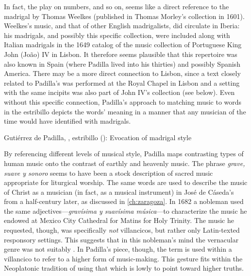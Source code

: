 In fact, the play on numbers,  and so on, seems like a
direct reference to the madrigal  by Thomas Weelkes (published in Thomas Morley's collection
 in 1601).
Weelkes's music, and that of other English madrigalists, did circulate in
Iberia: his madrigals, and possibly this specific collection, were included
along with Italian madrigals in the 1649 catalog of the music collection of
Portuguese King John (João) IV in Lisbon.%
    \Autocite[, 584]{JohnIV:Catalog}
It therefore seems plausible that this repertoire was also known in Spain (where
Padilla lived into his thirties) and possibly Spanish America.
There may be a more direct connection to Lisbon, since a text closely related to
Padilla's  was performed at the Royal Chapel in Lisbon and a
setting with the same incipits was also part of John IV's collection (see
below).
Even without this specific connection, Padilla's approach to matching music to
words in the estribillo depicts the words' meaning in a manner that any musician
of the time would have identified with madrigals.

\begin{musicexample}
    \caption{Gutiérrez de Padilla, , estribillo
    (): Evocation of madrigal style}

    \label{music:Padilla-Voces-madrigal}
\end{musicexample}

By referencing different levels of musical style, Padilla maps contrasting types
of human music onto the contrast of earthly and heavenly music.
The phrase \emph{grave, suave y sonoro} seems to have been a stock description
of sacred music appropriate for liturgical worship.%
    \Autocite
    [On \emph{suave} and other common vocabulary used to evoke music in Spanish
    poetry of the period, see][]{UribeBracho:OrfeoPhD}
The same words are used to describe the music of Christ as a musician (in fact,
as a musical instrument) in José de Cáseda's  from a
half-century later, as discussed in \cref{ch:zaragoza}.
In 1682 a nobleman used the same adjectives---\emph{gravísima y suavísima
música}---to characterize the music he endowed at Mexico City Cathedral for
Matins for Holy Trinity.%
    \Autocite[140--141]{Goldman:Responsory}
The music he requested, though, was specifically \emph{not} villancicos, but
rather only Latin-texted responsory settings.
This suggests that in this nobleman's mind the vernacular genre was not suitably
.
In Padilla's piece, though, the term is used within a villancico to refer to a
higher form of music-making. 
This gesture fits within the Neoplatonic tradition of using that which is lowly
to point toward higher truths.

